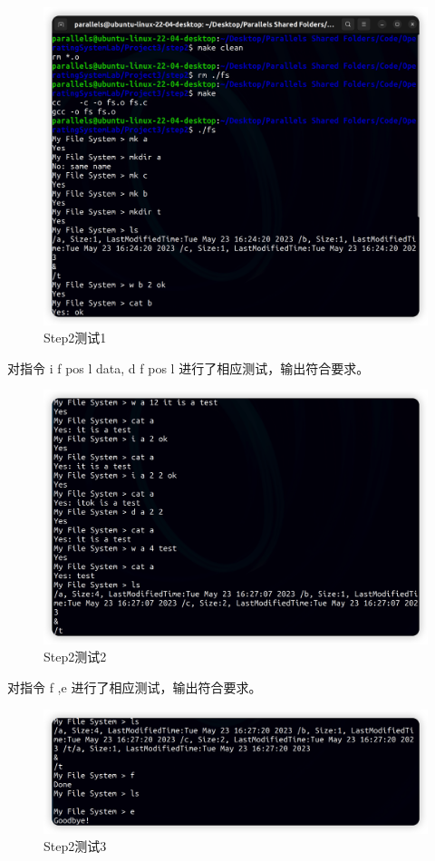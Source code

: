 \documentclass{article}
\begin{document}
\begin{figure}[H]
\center
\includegraphics[scale = 0.35]{s2-t1.png}
\caption{Step2测试1}
\label{s2-t1}
\end{figure}

对指令 i f pos l data, d f pos l 进行了相应测试，输出符合要求。

\begin{figure}[H]
\center
\includegraphics[scale = 0.35]{s2-t2.png}
\caption{Step2测试2}
\label{s2-t2}
\end{figure}

对指令 f ,e 进行了相应测试，输出符合要求。

\begin{figure}[H]
\center
\includegraphics[scale = 0.35]{s2-t3.png}
\caption{Step2测试3}
\label{s2-t3}
\end{figure}
\end{document}
